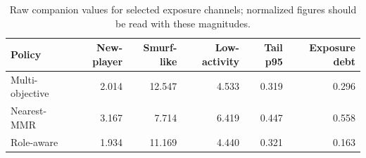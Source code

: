 \begin{table}[t]
\centering
\scriptsize
\caption{Raw companion values for selected exposure channels; normalized figures should be read with these magnitudes.}
\label{tab:raw-companion}
\setlength{\tabcolsep}{3pt}
\begin{tabularx}{\textwidth}{lrrrrr}
\toprule
Policy & New-player & Smurf-like & Low-activity & Tail p95 & Exposure debt \\
\midrule
Multi-objective & 2.014 & 12.547 & 4.533 & 0.319 & 0.296 \\
Nearest-MMR & 3.167 & 7.714 & 6.419 & 0.447 & 0.558 \\
Role-aware & 1.934 & 11.169 & 4.440 & 0.321 & 0.163 \\
\bottomrule
\end{tabularx}
\end{table}
